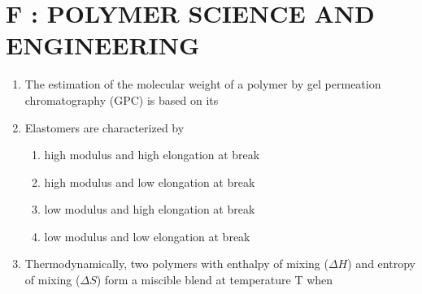 \documentclass[a4paper,10pt]{article}
\begin{document}
\section*{F : POLYMER SCIENCE AND ENGINEERING}
\begin{enumerate}
    \item The estimation of the molecular weight of a polymer by gel permeation chromatography (GPC) is based on its
    
    \hfill{}
    \begin{enumerate}
    \end{enumerate}

    \item Elastomers are characterized by
    
    \hfill{}
    \begin{enumerate}
        \item high modulus and high elongation at break
        \item high modulus and low elongation at break
        \item low modulus and high elongation at break
        \item low modulus and low elongation at break
    \end{enumerate}

    \item Thermodynamically, two polymers with enthalpy of mixing ($\Delta H$) and entropy of mixing ($\Delta S$) form a miscible blend at temperature T when
    
    \hfill{}
    \begin{enumerate}
    \end{enumerate}


\end{enumerate}
\end{document}
